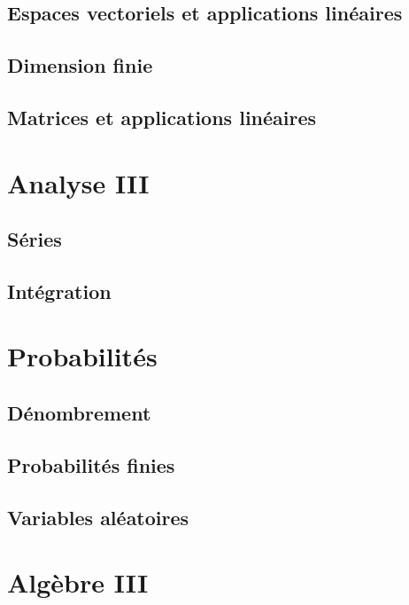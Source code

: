 \documentclass[a4paper,french,bookmarks]{book}
\begin{document}
    \chapter{Espaces vectoriels et applications linéaires}
    
    \chapter{Dimension finie}
    
    \chapter{Matrices et applications linéaires}
    
    \part{Analyse III}
    
    \chapter{Séries}
    
    \chapter{Intégration}
    
    \part{Probabilités}
    
    \chapter{Dénombrement}
    
    \chapter{Probabilités finies}
    
    \chapter{Variables aléatoires}
    
    \part{Algèbre III}
\end{document}
